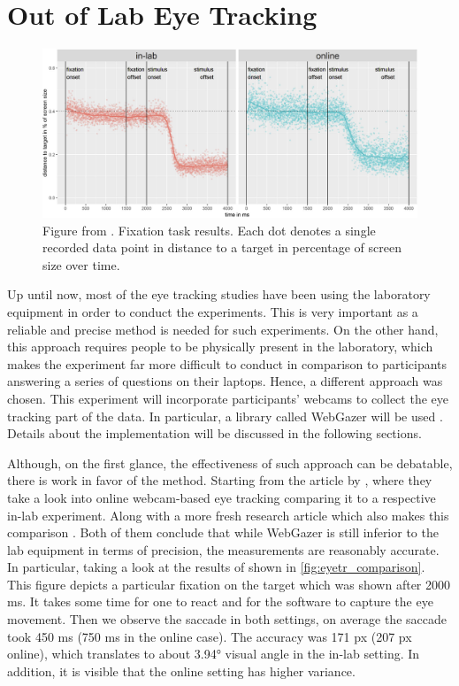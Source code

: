 \section{Out of Lab Eye Tracking} \label{sec:eyetr}
\begin{figure}
    \centering
    \includegraphics[width=1\linewidth]{images/tracker_comparison.png}
    \caption{Figure from \cite{Semmelmann_2018}. Fixation task results. Each dot denotes a single recorded data point in distance to a target in percentage of screen size over time.}
    \label{fig:eyetr_comparison}
\end{figure}
Up until now, most of the eye tracking studies have been using the laboratory equipment in order to conduct the experiments. This is very important as a reliable and precise method is needed for such experiments. On the other hand, this approach requires people to be physically present in the laboratory, which makes the experiment far more difficult to conduct in comparison to participants answering a series of questions on their laptops. Hence, a different approach was chosen. This experiment will incorporate participants' webcams to collect the eye tracking part of the data. In particular, a library called WebGazer will be used \citep{webgazer}. Details about the implementation will be discussed in the following sections. 

Although, on the first glance, the effectiveness of such approach can be debatable, there is work in favor of the method. Starting from the article by \cite{Semmelmann_2018}, where they take a look into online webcam-based eye tracking comparing it to a respective in-lab experiment. Along with a more fresh research article which also makes this comparison \citep{Wisiecka_2022}. Both of them conclude that while WebGazer is still inferior to the lab equipment in terms of precision, the measurements are reasonably accurate. In particular, taking a look at the results of \cite{Semmelmann_2018} shown in \autoref{fig:eyetr_comparison}. This figure depicts a particular fixation on the target which was shown after 2000 ms. It takes some time for one to react and for the software to capture the eye movement. Then we observe the saccade in both settings, on average the saccade took 450 ms (750 ms in the online case). The accuracy was 171 px (207 px online), which translates to about 3.94° visual angle in the in-lab setting. In addition, it is visible that the online setting has higher variance.

